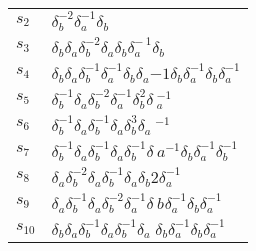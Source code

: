 \documentclass{article}
\begin{document}
\begin{center}
\begin{tabular}{ll}
$s_{2}$ & $\delta_b^{-2}\delta_a^{-1}\delta_b^{}$ \\
$s_{3}$ & $\delta_b^{}\delta_a^{}\delta_b^{-2}\delta_a^{}\delta_b^{}\delta_a^{-\
1}\delta_b^{}$ \\
$s_{4}$ & $\delta_b^{}\delta_a^{}\delta_b^{-1}\delta_a^{-1}\delta_b^{}\delta_a^\
{-1}\delta_b^{}\delta_a^{-1}\delta_b^{}\delta_a^{-1}$ \\
$s_{5}$ & $\delta_b^{-1}\delta_a^{}\delta_b^{-2}\delta_a^{-1}\delta_b^{2}\delta\
_a^{-1}$ \\
$s_{6}$ & $\delta_b^{-1}\delta_a^{}\delta_b^{-1}\delta_a^{}\delta_b^{3}\delta_a\
^{-1}$ \\
$s_{7}$ & $\delta_b^{-1}\delta_a^{}\delta_b^{-1}\delta_a^{}\delta_b^{-1}\delta_\
a^{-1}\delta_b^{}\delta_a^{-1}\delta_b^{-1}$ \\
$s_{8}$ & $\delta_a^{}\delta_b^{-2}\delta_a^{}\delta_b^{-1}\delta_a^{}\delta_b^\
{2}\delta_a^{-1}$ \\
$s_{9}$ & $\delta_a^{}\delta_b^{-1}\delta_a^{}\delta_b^{-2}\delta_a^{-1}\delta_\
b^{}\delta_a^{-1}\delta_b^{}\delta_a^{-1}$ \\
$s_{10}$ & $\delta_b^{}\delta_a^{}\delta_b^{-1}\delta_a^{}\delta_b^{-1}\delta_a\
^{}\delta_b^{}\delta_a^{-1}\delta_b^{}\delta_a^{-1}$ \\
\bottomrule
\end{tabular}
\end{center}

\thispagestyle{empty}
\end{document}
